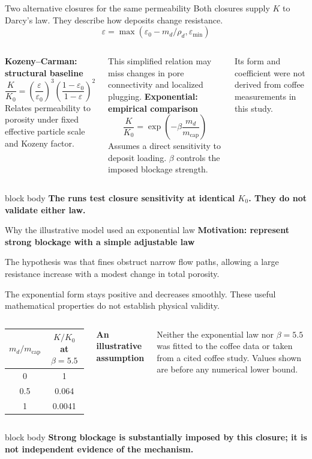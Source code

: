 \documentclass[aspectratio=169,11pt]{beamer}
\newcommand{\hi}[1]{\textcolor{tumblue}{\textbf{#1}}}
\newcommand{\takeaway}[1]{%
  \begin{beamercolorbox}[rounded=true,sep=.55em]{block body}
    \centering\color{tumdark}\textbf{#1}
  \end{beamercolorbox}}
\begin{document}
\begin{frame}{Two alternative closures for the same permeability}
\small
Both closures supply $K$ to Darcy's law. They describe how deposits change resistance.
\[\varepsilon=\max\left(\varepsilon_0-m_d/\rho_d,\varepsilon_{\min}\right)\]
\begin{columns}[T,onlytextwidth]
\hi{Kozeny--Carman: structural baseline}
\[\frac{K}{K_0}=\left(\frac{\varepsilon}{\varepsilon_0}\right)^3
\left(\frac{1-\varepsilon_0}{1-\varepsilon}\right)^2\]
Relates permeability to porosity under fixed effective particle scale and Kozeny factor.
\par\medskip This simplified relation may miss changes in pore connectivity and localized plugging.
\hi{Exponential: empirical comparison}
\[\frac{K}{K_0}=\exp\left(-\beta\frac{m_d}{m_{\mathrm{cap}}}\right)\]
Assumes a direct sensitivity to deposit loading. $\beta$ controls the imposed blockage strength.
\par\medskip Its form and coefficient were not derived from coffee measurements in this study.
\end{columns}
\vfill\takeaway{The runs test closure sensitivity at identical $K_0$. They do not validate either law.}
\end{frame}

\begin{frame}{Why the illustrative model used an exponential law}
\small
\hi{Motivation: represent strong blockage with a simple adjustable law}
\par\medskip
The hypothesis was that fines obstruct narrow flow paths, allowing a large resistance increase with a modest change in total porosity.
\par\medskip
The exponential form stays positive and decreases smoothly. These useful mathematical properties do not establish physical validity.
\medskip
\begin{columns}[c,onlytextwidth]
\begin{tabular}{cc}\toprule
$m_d/m_{\mathrm{cap}}$ & $K/K_0$ at $\beta=5.5$\\\midrule
0 & 1\\[.35em]
0.5 & 0.064\\[.35em]
1 & 0.0041\\\bottomrule
\end{tabular}
\hi{An illustrative assumption}
\par\medskip
Neither the exponential law nor $\beta=5.5$ was fitted to the coffee data or taken from a cited coffee study. Values shown are before any numerical lower bound.
\end{columns}
\vfill\takeaway{Strong blockage is substantially imposed by this closure; it is not independent evidence of the mechanism.}
\end{frame}
\end{document}
